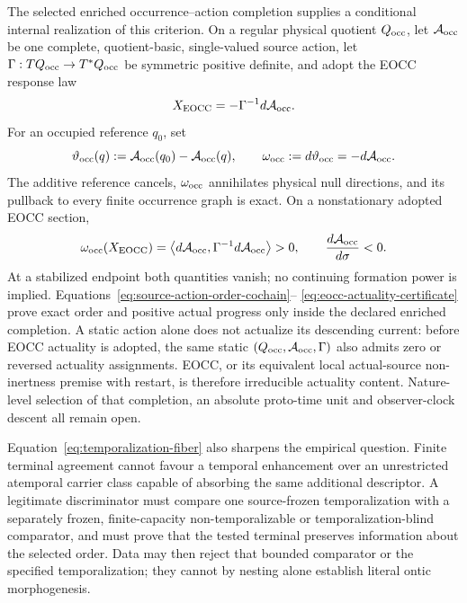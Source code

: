 \documentclass[11pt]{article}
\begin{document}
The selected enriched occurrence--action completion supplies a conditional
internal realization of this criterion.  On a regular physical quotient
$Q_{\rm occ}$, let $\mathcal A_{\rm occ}$ be one complete, quotient-basic,
single-valued source action, let $\Gamma:TQ_{\rm occ}\to T^*Q_{\rm occ}$ be
symmetric positive definite, and adopt the EOCC response law
\begin{equation}
 X_{\rm EOCC}=-\Gamma^{-1}d\mathcal A_{\rm occ}.
 \label{eq:eocc-gradient-current}
\end{equation}
For an occupied reference $q_0$, set
\begin{equation}
 \vartheta_{\rm occ}(q)
 :=\mathcal A_{\rm occ}(q_0)-\mathcal A_{\rm occ}(q),
 \qquad
 \omega_{\rm occ}:=d\vartheta_{\rm occ}=-d\mathcal A_{\rm occ}.
 \label{eq:source-action-order-cochain}
\end{equation}
The additive reference cancels, $\omega_{\rm occ}$ annihilates physical null
directions, and its pullback to every finite occurrence graph is exact.  On a
nonstationary adopted EOCC section,
\begin{equation}
 \omega_{\rm occ}(X_{\rm EOCC})
 =\left\langle d\mathcal A_{\rm occ},
   \Gamma^{-1}d\mathcal A_{\rm occ}\right\rangle>0,
 \qquad
 \frac{d\mathcal A_{\rm occ}}{d\sigma}<0.
 \label{eq:eocc-actuality-certificate}
\end{equation}
At a stabilized endpoint both quantities vanish; no continuing formation
power is implied.  Equations~\eqref{eq:source-action-order-cochain}--
\eqref{eq:eocc-actuality-certificate} prove exact order and positive actual
progress only inside the declared enriched completion.  A static action alone
does not actualize its descending current: before EOCC actuality is adopted,
the same static $(Q_{\rm occ},\mathcal A_{\rm occ},\Gamma)$ also admits zero
or reversed actuality assignments.
EOCC, or its equivalent local actual-source non-inertness premise with restart,
is therefore irreducible actuality content.  Nature-level selection of that
completion, an absolute proto-time unit and observer-clock descent all remain
open.

Equation~\eqref{eq:temporalization-fiber} also sharpens the empirical question.
Finite terminal agreement cannot favour a temporal enhancement over an
unrestricted atemporal carrier class capable of absorbing the same additional
descriptor.  A legitimate discriminator must compare one source-frozen
temporalization with a separately frozen, finite-capacity non-temporalizable
or temporalization-blind comparator, and must prove that the tested terminal
preserves information about the selected order.  Data may then reject that
bounded comparator or the specified temporalization; they cannot by nesting
alone establish literal ontic morphogenesis.
\end{document}
